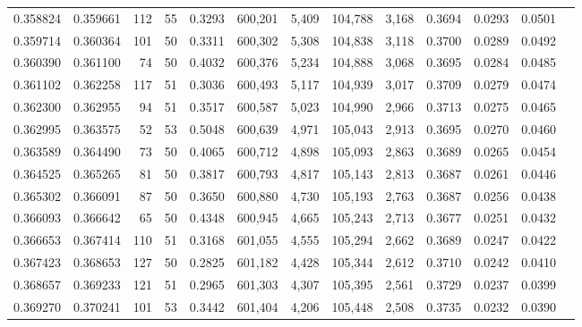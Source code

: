 \begin{tabular}{rrrrrrrrrrrrr}
0.358824 & 0.359661 &   112 &  55 &                                     0.3293 & 600,201 &   5,409 & 104,788 &   3,168 & 0.3694 & 0.0293 & 0.0501 \\
0.359714 & 0.360364 &   101 &  50 &                                     0.3311 & 600,302 &   5,308 & 104,838 &   3,118 & 0.3700 & 0.0289 & 0.0492 \\
0.360390 & 0.361100 &    74 &  50 &                                     0.4032 & 600,376 &   5,234 & 104,888 &   3,068 & 0.3695 & 0.0284 & 0.0485 \\
0.361102 & 0.362258 &   117 &  51 &                                     0.3036 & 600,493 &   5,117 & 104,939 &   3,017 & 0.3709 & 0.0279 & 0.0474 \\
0.362300 & 0.362955 &    94 &  51 &                                     0.3517 & 600,587 &   5,023 & 104,990 &   2,966 & 0.3713 & 0.0275 & 0.0465 \\
0.362995 & 0.363575 &    52 &  53 &                                     0.5048 & 600,639 &   4,971 & 105,043 &   2,913 & 0.3695 & 0.0270 & 0.0460 \\
0.363589 & 0.364490 &    73 &  50 &                                     0.4065 & 600,712 &   4,898 & 105,093 &   2,863 & 0.3689 & 0.0265 & 0.0454 \\
0.364525 & 0.365265 &    81 &  50 &                                     0.3817 & 600,793 &   4,817 & 105,143 &   2,813 & 0.3687 & 0.0261 & 0.0446 \\
0.365302 & 0.366091 &    87 &  50 &                                     0.3650 & 600,880 &   4,730 & 105,193 &   2,763 & 0.3687 & 0.0256 & 0.0438 \\
0.366093 & 0.366642 &    65 &  50 &                                     0.4348 & 600,945 &   4,665 & 105,243 &   2,713 & 0.3677 & 0.0251 & 0.0432 \\
0.366653 & 0.367414 &   110 &  51 &                                     0.3168 & 601,055 &   4,555 & 105,294 &   2,662 & 0.3689 & 0.0247 & 0.0422 \\
0.367423 & 0.368653 &   127 &  50 &                                     0.2825 & 601,182 &   4,428 & 105,344 &   2,612 & 0.3710 & 0.0242 & 0.0410 \\
0.368657 & 0.369233 &   121 &  51 &                                     0.2965 & 601,303 &   4,307 & 105,395 &   2,561 & 0.3729 & 0.0237 & 0.0399 \\
0.369270 & 0.370241 &   101 &  53 &                                     0.3442 & 601,404 &   4,206 & 105,448 &   2,508 & 0.3735 & 0.0232 & 0.0390 \\

\end{tabular}
